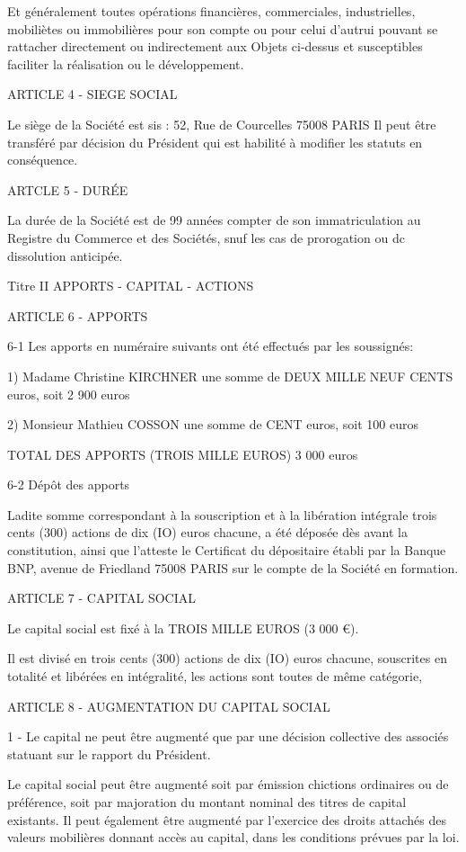 \documentclass{article}
\begin{document}
Et généralement toutes opérations financières, commerciales, industrielles, mobiliètes ou immobilières pour son compte ou pour celui d'autrui pouvant se rattacher directement ou indirectement aux Objets ci-dessus et susceptibles faciliter la réalisation ou le développement.

ARTICLE 4 - SIEGE SOCIAL

Le siège de la Société est sis :
52, Rue de Courcelles
75008 PARIS
Il peut être transféré par décision du Président qui est habilité à modifier les statuts en conséquence.

ARTCLE 5 - DURÉE

La durée de la Société est de 99 années compter de son immatriculation au Registre du
Commerce et des Sociétés, snuf les cas de prorogation ou dc dissolution anticipée.

Titre II
APPORTS - CAPITAL - ACTIONS

ARTICLE 6 - APPORTS

6-1 Les apports en numéraire suivants ont été effectués par les soussignés:

1) Madame Christine KIRCHNER
une somme de DEUX MILLE NEUF CENTS euros,
soit 2 900 euros

2) Monsieur Mathieu COSSON
une somme de CENT euros,
soit 100 euros

TOTAL DES APPORTS (TROIS MILLE EUROS) 3 000 euros

6-2 Dépôt des apports

Ladite somme correspondant à la souscription et à la libération intégrale trois cents (300) actions de dix (IO) euros chacune, a été déposée dès avant la constitution, ainsi que l'atteste le Certificat du dépositaire établi par la Banque BNP, avenue de Friedland 75008 PARIS sur le compte de la Société en formation.

ARTICLE 7 - CAPITAL SOCIAL

Le capital social est fixé à la TROIS MILLE EUROS (3 000 €).

Il est divisé en trois cents (300) actions de dix (IO) euros chacune, souscrites en totalité et libérées en intégralité, les actions sont toutes de même catégorie,

ARTICLE 8 - AUGMENTATION DU CAPITAL SOCIAL

1 - Le capital ne peut être augmenté que par une décision collective des associés statuant sur le rapport du Président.

Le capital social peut être augmenté soit par émission chictions ordinaires ou de préférence, soit par majoration du montant nominal des titres de capital existants. Il peut également être augmenté par l'exercice des droits attachés des valeurs mobilières donnant accès au capital, dans les conditions prévues par la loi.
\end{document}

